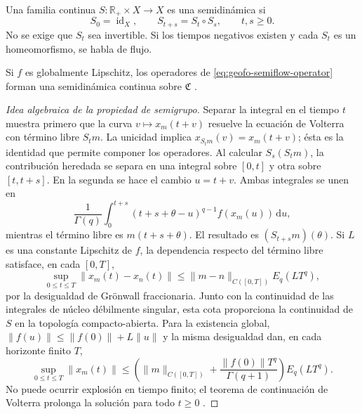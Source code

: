 \begin{definition}
Una familia continua \(S:\mathbb R_+\times X\to X\) es una semidinámica si
\begin{equation}
 S_0=\operatorname{id}_X,
 \qquad S_{t+s}=S_t\circ S_s,
 \qquad t,s\geq0.
 \label{eq:geofo-semiflow-law}
\end{equation}
No se exige que \(S_t\) sea invertible. Si los tiempos negativos existen y
cada \(S_t\) es un homeomorfismo, se habla de flujo.
\end{definition}

\begin{proposition}
Si \(f\) es globalmente Lipschitz, los operadores de
\cref{eq:geofo-semiflow-operator} forman una semidinámica continua sobre
\(\mathfrak C\) \cite{DoanKloeden2021Semidynamical}.
\end{proposition}

\begin{proof}[Idea algebraica de la propiedad de semigrupo]
Separar la integral en el tiempo \(t\) muestra primero que la curva
\(v\mapsto x_m(t+v)\) resuelve la ecuación de Volterra con término libre
\(S_tm\). La unicidad implica
\(x_{S_tm}(v)=x_m(t+v)\); ésta es la identidad que permite componer los
operadores.
Al calcular \(S_s(S_tm)\), la contribución heredada se separa en una integral
sobre \([0,t]\) y otra sobre \([t,t+s]\). En la segunda se hace el cambio
\(u=t+v\). Ambas integrales se unen en
\begin{equation*}
 \frac1{\Gamma(q)}\int_0^{t+s}
 (t+s+\theta-u)^{q-1}f(x_m(u))\,\mathrm du,
\end{equation*}
mientras el término libre es \(m(t+s+\theta)\). El resultado es
\((S_{t+s}m)(\theta)\). Si \(L\) es una constante Lipschitz de \(f\),
la dependencia respecto del término libre satisface, en cada \([0,T]\),
\[
 \sup_{0\leq t\leq T}\|x_m(t)-x_n(t)\|
 \leq\|m-n\|_{C([0,T])}E_q(LT^q),
\]
por la desigualdad de Grönwall fraccionaria. Junto con la continuidad de las
integrales de núcleo débilmente singular, esta cota proporciona la
continuidad de \(S\) en la topología compacto-abierta. Para la existencia
global, \(\|f(u)\|\le\|f(0)\|+L\|u\|\) y la misma desigualdad dan,
en cada horizonte finito \(T\),
\[
 \sup_{0\le t\le T}\|x_m(t)\|
 \le\left(\|m\|_{C([0,T])}
       +\frac{\|f(0)\|T^q}{\Gamma(q+1)}\right)E_q(LT^q).
\]
No puede ocurrir explosión en tiempo finito; el teorema de continuación de
Volterra prolonga la solución para todo \(t\ge0\)
\cite{DoanKloeden2021Semidynamical}.
\end{proof}

